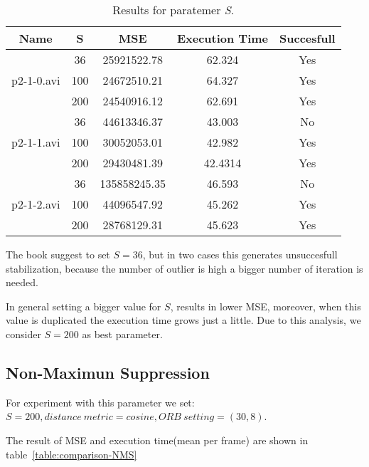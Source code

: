 \begin{table}[H]
\centering
\begin{tabular}{|c|c|c|c|c|}
\hline
\textbf{Name} & \textbf{S} & \textbf{MSE} & \textbf{Execution Time} & \textbf{Succesfull} \\ \hline
\multirow{3}{*}{p2-1-0.avi} & 36 & 25921522.78 & 62.324 & Yes \\ \cline{2-5} 
 & 100 & 24672510.21 & 64.327 & Yes \\ \cline{2-5} 
 & 200 & 24540916.12 & 62.691 & Yes \\ \hline
\multirow{3}{*}{p2-1-1.avi} & 36 & 44613346.37 & 43.003 & No \\ \cline{2-5} 
 & 100 & 30052053.01 & 42.982 & Yes \\ \cline{2-5} 
 & 200 & 29430481.39 & 42.4314 & Yes \\ \hline
\multirow{3}{*}{p2-1-2.avi} & 36 & 135858245.35 & 46.593 & No \\ \cline{2-5} 
 & 100 & 44096547.92 & 45.262 & Yes \\ \cline{2-5} 
 & 200 & 28768129.31 & 45.623 & Yes \\ \hline
\end{tabular}
\caption{Results for paratemer \textit{S}.}
\label{table:comparison-S}
\end{table}

The book suggest to set $S=36$, but in two cases this generates unsuccesfull stabilization, because the number of outlier is high a bigger number of iteration is needed.

In general setting a bigger value for $S$, results in lower MSE, moreover, when this value is duplicated the execution time grows just a little. Due to this analysis, we consider $S=200$ as best parameter.

\subsection{Non-Maximun Suppression}

For experiment with this parameter we set: $S=200, distance~metric=cosine, ORB~ setting = (30,8)$.

The result of MSE and execution time(mean per frame) are shown in table~\ref{table:comparison-NMS}

